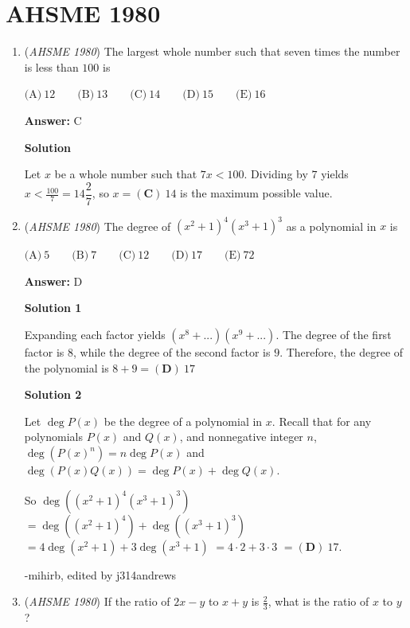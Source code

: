 \section{AHSME 1980}
        \begin{enumerate}
        	\item (\textit{AHSME 1980}) The largest whole number such that seven times the number is less than $100$ is


 $\text{(A)} \ 12 \qquad \text{(B)} \ 13 \qquad \text{(C)} \ 14 \qquad \text{(D)} \ 15 \qquad \text{(E)} \ 16$

 \textbf{Answer: }C



\textbf{Solution}

Let $x$ be a whole number such that $7x < 100$. Dividing by $7$ yields $x < \frac{100}{7} =  14\dfrac{2}{7}$, so $x = \boxed{(\textbf{C})\ 14}$ is the maximum possible value.

 


	\item (\textit{AHSME 1980}) The degree of $(x^2+1)^4 (x^3+1)^3$ as a polynomial in $x$ is


 $\text{(A)} \ 5 \qquad \text{(B)} \ 7 \qquad \text{(C)} \ 12 \qquad \text{(D)} \ 17 \qquad \text{(E)} \ 72$

 \textbf{Answer: }D



\textbf{Solution 1}

Expanding each factor yields $(x^{8}+...)(x^{9}+...)$. The degree of the first factor is $8$, while the degree of the second factor is $9$. Therefore, the degree of the polynomial is $8 + 9 = \boxed{(\textbf{D})\ 17}$




\textbf{Solution 2}

Let $\deg{P(x)}$ be the degree of a polynomial in $x$.  Recall that for any polynomials $P(x)$ and $Q(x)$, and nonnegative integer $n$, $\deg{(P(x)^n)} = n \deg{P(x)}$ and $\deg{(P(x)Q(x))} = \deg {P(x)} + \deg {Q(x)}$.

 So $\deg{((x^2+1)^4(x^3+1)^3)}$ $= \deg{((x^2+1)^4)} + \deg{((x^3+1)^3)}$ $= 4 \deg{(x^2+1)} + 3 \deg{(x^3+1)}$ $= 4 \cdot 2 + 3 \cdot 3$ $= \boxed{(\textbf{D})\ 17}$.

 -mihirb, edited by j314andrews

 


	\item (\textit{AHSME 1980}) If the ratio of $2x-y$ to $x+y$ is $\frac{2}{3}$, what is the ratio of $x$ to $y$?



\end{enumerate}
